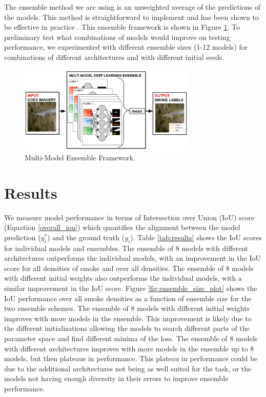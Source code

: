 \documentclass{article}
\begin{document}
The ensemble method we are using is an unweighted average of the predictions of the models. This method is straightforward to implement and has been shown to be effective in practice \citep{nn-ensemble2}. This ensemble framework is shown in Figure \ref{fig:ensemble_framework}. To preliminary test what combinations of models would improve on testing performance, we experimented with different ensemble sizes (1-12 models) for combinations of different architectures and with different initial seeds.
\begin{figure}[h]
    \centering
    \includegraphics[width=0.75\textwidth]{ensemble_framework.png}
    \caption{Multi-Model Ensemble Framework.}
    \label{fig:ensemble_framework}
\end{figure}
\section{Results}
We measure model performance in terms of Intersection over Union (IoU) score (Equation \ref{overall_iou}) which quantifies the alignment between the model prediction ($ y^*_{i} $) and the ground truth ($y_{i}$). Table \ref{tab:results} shows the IoU scores for individual models and ensembles. The ensemble of 8 models with different architectures outperforms the individual models, with an improvement in the IoU score for all densities of smoke and over all densities. The ensemble of 8 models with different initial weights also outperforms the individual models, with a similar improvement in the IoU score. Figure \ref{fig:ensemble_size_plot} shows the IoU performance over all smoke densities as a function of ensemble size for the two ensemble schemes. The ensemble of 8 models with different initial weights improves with more models in the ensemble. This improvement is likely due to the different initializations allowing the models to search different parts of the parameter space and find different minima of the loss. The ensemble of 8 models with different architectures improves with more models in the ensemble up to 8 models, but then plateaus in performance. This plateau in performance could be due to the additional architectures not being as well suited for the task, or the models not having enough diversity in their errors to improve ensemble performance.
\end{document}
